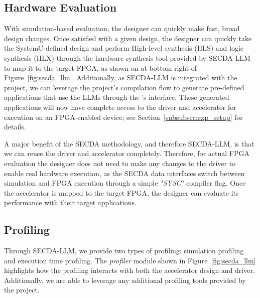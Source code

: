 
\subsection{Hardware Evaluation}

With simulation-based evaluation, the designer can quickly make fast, broad design changes.
Once satisfied with a given design, the designer can quickly take the SystemC-defined design and perform High-level synthesis (HLS) and logic synthesis (HLX) through the hardware synthesis tool provided by SECDA-LLM to map it to the target FPGA, as shown on at bottom right of Figure~\ref{fig:secda_llm}.
Additionally, as SECDA-LLM is integrated with the \LPP project, we can leverage the \LPP project's compilation flow to generate pre-defined applications that use the LLMs through the \LPP's interface.
These generated applications will now have complete access to the driver and accelerator for execution on an FPGA-enabled device; see Section~\ref{subsubsec:exp_setup} for details.

A major benefit of the SECDA methodology, and therefore SECDA-LLM, is that we can reuse the driver and accelerator completely.
Therefore, for actual FPGA evaluation the designer does not need to make any changes to the driver to enable real hardware execution, as the SECDA data interfaces switch between simulation and FPGA execution through a simple \textit{"SYSC" }compiler flag.
Once the accelerator is mapped to the target FPGA, the designer can evaluate its performance with their target applications.



\subsection{Profiling}


Through SECDA-LLM, we provide two types of profiling: simulation profiling and execution time profiling.
The \emph{profiler} module shown in Figure~\ref{fig:secda_llm} highlights how the profiling interacts with both the accelerator design and driver.
Additionally, we are able to leverage any additional profiling tools provided by the \LPP project.


